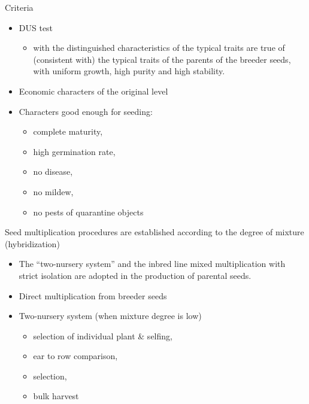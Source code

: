 \documentclass[11pt,dvipsnames,ignorenonframetext,aspectratio=169]{beamer}
\providecommand{\tightlist}{%
  \setlength{\itemsep}{0pt}\setlength{\parskip}{0pt}}
\begin{document}
\begin{frame}{Criteria}
\protect\hypertarget{criteria}{}

\begin{itemize}
\tightlist
\item
  DUS test

  \begin{itemize}
  \tightlist
  \item
    with the distinguished characteristics of the typical traits are
    true of (consistent with) the typical traits of the parents of the
    breeder seeds, with uniform growth, high purity and high stability.
  \end{itemize}
\item
  Economic characters of the original level
\item
  Characters good enough for seeding:

  \begin{itemize}
  \tightlist
  \item
    complete maturity,\\
  \item
    high germination rate,
  \item
    no disease,
  \item
    no mildew,
  \item
    no pests of quarantine objects
  \end{itemize}
\end{itemize}

\end{frame}

\begin{frame}{Seed multiplication procedures are established according
to the degree of mixture (hybridization)}
\protect\hypertarget{seed-multiplication-procedures-are-established-according-to-the-degree-of-mixture-hybridization}{}

\begin{itemize}
\tightlist
\item
  The ``two-nursery system'' and the inbred line mixed multiplication
  with strict isolation are adopted in the production of parental seeds.
\item
  Direct multiplication from breeder seeds
\item
  Two-nursery system (when mixture degree is low)

  \begin{itemize}
  \tightlist
  \item
    selection of individual plant \& selfing,
  \item
    ear to row comparison,
  \item
    selection,
  \item
    bulk harvest
  \end{itemize}
\end{itemize}

\end{frame}
\end{document}
